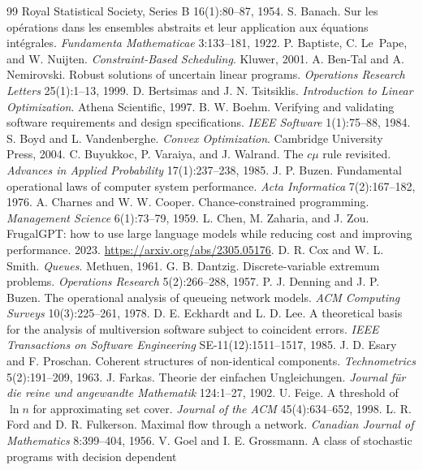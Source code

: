\documentclass[11pt]{article}
\theoremstyle{definition}
\theoremstyle{remark}
\begin{document}
\begin{thebibliography}{99}
{Royal Statistical Society, Series B} 16(1):80--87, 1954.
 S. Banach. Sur les op\'erations dans les ensembles abstraits et leur application aux
\'equations int\'egrales. \emph{Fundamenta Mathematicae} 3:133--181, 1922.
 P. Baptiste, C. Le~Pape, and W. Nuijten. \emph{Constraint-Based Scheduling}.
Kluwer, 2001.
 A. Ben-Tal and A. Nemirovski. Robust solutions of uncertain linear programs.
\emph{Operations Research Letters} 25(1):1--13, 1999.
 D. Bertsimas and J. N. Tsitsiklis. \emph{Introduction to Linear Optimization}.
Athena Scientific, 1997.
 B. W. Boehm. Verifying and validating software requirements and design
specifications. \emph{IEEE Software} 1(1):75--88, 1984.
 S. Boyd and L. Vandenberghe. \emph{Convex Optimization}. Cambridge University Press,
2004.
 C. Buyukkoc, P. Varaiya, and J. Walrand. The $c\mu$ rule revisited. \emph{Advances
in Applied Probability} 17(1):237--238, 1985.
 J. P. Buzen. Fundamental operational laws of computer system performance.
\emph{Acta Informatica} 7(2):167--182, 1976.
 A. Charnes and W. W. Cooper. Chance-constrained programming. \emph{Management
Science} 6(1):73--79, 1959.
 L. Chen, M. Zaharia, and J. Zou. FrugalGPT: how to use large language models while
reducing cost and improving performance. 2023. \url{https://arxiv.org/abs/2305.05176}.
 D. R. Cox and W. L. Smith. \emph{Queues}. Methuen, 1961.
 G. B. Dantzig. Discrete-variable extremum problems. \emph{Operations Research}
5(2):266--288, 1957.
 P. J. Denning and J. P. Buzen. The operational analysis of queueing network models.
\emph{ACM Computing Surveys} 10(3):225--261, 1978.
 D. E. Eckhardt and L. D. Lee. A theoretical basis for the analysis of multiversion
software subject to coincident errors. \emph{IEEE Transactions on Software Engineering}
SE-11(12):1511--1517, 1985.
 J. D. Esary and F. Proschan. Coherent structures of non-identical components.
\emph{Technometrics} 5(2):191--209, 1963.
 J. Farkas. Theorie der einfachen Ungleichungen. \emph{Journal f\"ur die reine und
angewandte Mathematik} 124:1--27, 1902.
 U. Feige. A threshold of $\ln n$ for approximating set cover. \emph{Journal of the
ACM} 45(4):634--652, 1998.
 L. R. Ford and D. R. Fulkerson. Maximal flow through a network.
\emph{Canadian Journal of Mathematics} 8:399--404, 1956.
 V. Goel and I. E. Grossmann. A class of stochastic programs with decision dependent

\end{thebibliography}
\end{document}
